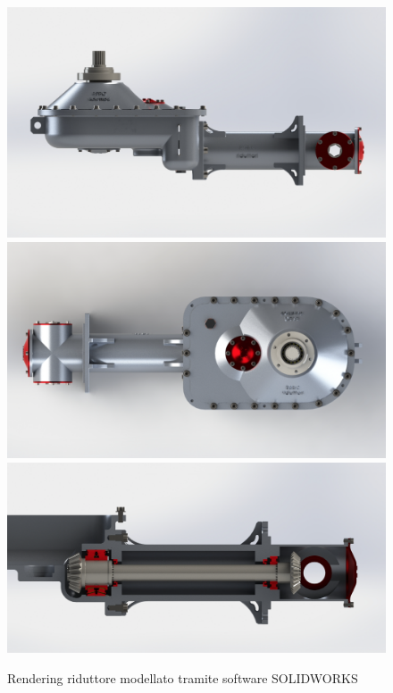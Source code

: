 \begin{figure}[h]
    \centering
     \includegraphics[scale=0.3]{Immagini/RenderingRiduttore3.png}
    \includegraphics[scale=0.3]{Immagini/RenderingRiduttore4.png}
    \includegraphics[scale=0.26]{Immagini/RenderingRiduttore5.png}
    \caption{Rendering riduttore modellato tramite software SOLIDWORKS}
    \label{fig:riduttore34}
\end{figure}
\newpage
